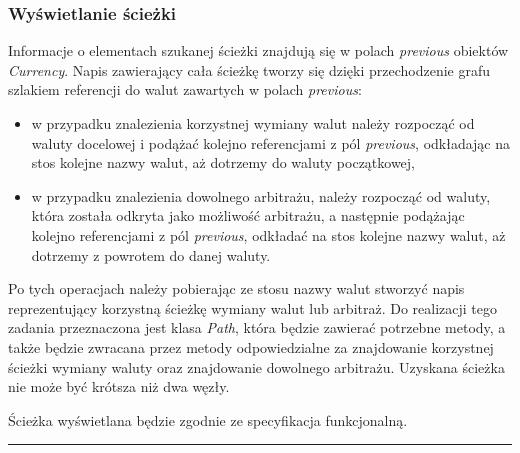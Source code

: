 \documentclass[a4paper,11pt]{article}
\newcommand{\linia}{\rule{\linewidth}{0.4mm}}
\begin{document}
\subsubsection{Wyświetlanie ścieżki}
Informacje o elementach szukanej ścieżki znajdują się w polach \textit{previous} obiektów \textit{Currency}.
Napis zawierający cała ścieżkę tworzy się dzięki przechodzenie grafu szlakiem referencji do walut zawartych w polach \textit{previous}:
\begin{itemize}
\item w przypadku znalezienia korzystnej wymiany walut należy rozpocząć od waluty docelowej i podążać kolejno referencjami z pól \textit{previous}, odkładając na stos kolejne nazwy walut, aż dotrzemy do waluty początkowej,
\item w przypadku znalezienia dowolnego arbitrażu, należy rozpocząć od waluty, która została odkryta jako możliwość arbitrażu, a następnie podążając kolejno referencjami z pól \textit{previous}, odkładać na stos kolejne nazwy walut, aż dotrzemy z powrotem do danej waluty.
\end{itemize}

Po tych operacjach należy pobierając ze stosu nazwy walut stworzyć napis reprezentujący korzystną ścieżkę wymiany walut lub arbitraż.
Do realizacji tego zadania przeznaczona jest klasa \textit{Path}, która będzie zawierać potrzebne metody, a także będzie zwracana przez metody odpowiedzialne za znajdowanie korzystnej ścieżki wymiany waluty oraz znajdowanie dowolnego arbitrażu.
Uzyskana ścieżka nie może być krótsza niż dwa węzły.

Ścieżka wyświetlana będzie zgodnie ze specyfikacja funkcjonalną.

\noindent\linia
\end{document}
